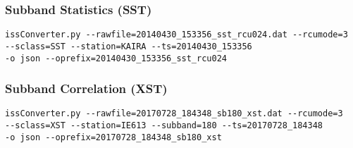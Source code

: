 \documentclass[10pt,a4paper]{article}
\begin{document}
\subsubsection{Subband Statistics (SST)}

\begin{verbatim}
issConverter.py --rawfile=20140430_153356_sst_rcu024.dat --rcumode=3
--sclass=SST --station=KAIRA --ts=20140430_153356
-o json --oprefix=20140430_153356_sst_rcu024
\end{verbatim}


\subsubsection{Subband Correlation (XST)}

\begin{verbatim}
issConverter.py --rawfile=20170728_184348_sb180_xst.dat --rcumode=3
--sclass=XST --station=IE613 --subband=180 --ts=20170728_184348
-o json --oprefix=20170728_184348_sb180_xst
\end{verbatim}
\end{document}
